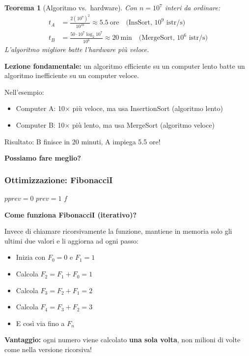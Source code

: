 \documentclass[a4paper, 11pt]{article}
\newtheorem{teorema}{Teorema}[section]
\theoremstyle{definition}
\theoremstyle{remark}
\theoremstyle{remark}
\begin{document}
	\begin{teorema}[Algoritmo vs.\ hardware]
		Con $n = 10^7$ interi da ordinare:
		\begin{align*}
			t_A &= \frac{2(10^7)^2}{10^{10}} \approx 5.5\ \text{ore}
			\quad\text{(InsSort, } 10^9 \text{ istr/s)} \\
			t_B &= \frac{50 \cdot 10^7 \log_2 10^7}{10^6} \approx 20\ \text{min}
			\quad\text{(MergeSort, } 10^6 \text{ istr/s)}
		\end{align*}
		L'algoritmo migliore batte l'hardware più veloce.
	\end{teorema}
	
	\begin{hardnote}
		\textbf{Lezione fondamentale:} un algoritmo efficiente su un computer lento batte un algoritmo inefficiente su un computer veloce.
		
		Nell'esempio:
		\begin{itemize}
			\item Computer A: 10× più veloce, ma usa InsertionSort (algoritmo lento)
			\item Computer B: 10× più lento, ma usa MergeSort (algoritmo veloce)
		\end{itemize}
		Risultato: B finisce in 20 minuti, A impiega 5.5 ore!
	\end{hardnote}
	
	\textbf{Possiamo fare meglio?}
	
	\subsubsection*{Ottimizzazione: FibonacciI }
	\begin{algorithm}[H]
		\caption{FibonacciI}
		$\mathit{pprev} = 0$\;
		$\mathit{prev} = 1$\;
		\Return $f$\;
	\end{algorithm}
	
	\begin{softnote}
		\textbf{Come funziona FibonacciI (iterativo)?}
		
		Invece di chiamare ricorsivamente la funzione, mantiene in memoria solo gli ultimi due valori e li aggiorna ad ogni passo:
		
		\begin{itemize}
			\item Inizia con $F_0=0$ e $F_1=1$
			\item Calcola $F_2 = F_1 + F_0 = 1$
			\item Calcola $F_3 = F_2 + F_1 = 2$
			\item Calcola $F_4 = F_3 + F_2 = 3$
			\item E così via fino a $F_n$
		\end{itemize}
		
		\textbf{Vantaggio:} ogni numero viene calcolato \textbf{una sola volta}, non milioni di volte come nella versione ricorsiva!
	\end{softnote}
	
\end{document}

